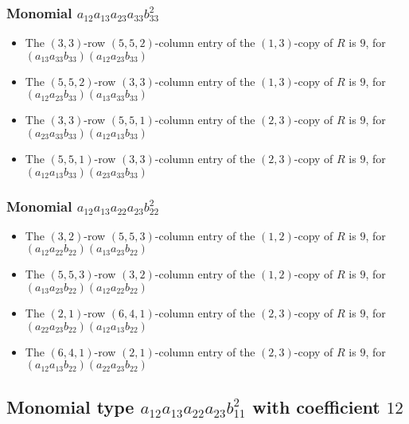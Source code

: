 \documentclass{article}
\begin{document}
\subsubsection{Monomial $ a_{12} a_{13} a_{23} a_{33} b_{33}^{2} $}

\begin{itemize}
\item The $(3, 3)$-row $(5, 5, 2)$-column entry of the $ \left(1, 3\right) $-copy of $R$ is $ 9 $, for $( a_{13} a_{33} b_{33} )( a_{12} a_{23} b_{33} )$ 
\item The $(5, 5, 2)$-row $(3, 3)$-column entry of the $ \left(1, 3\right) $-copy of $R$ is $ 9 $, for $( a_{12} a_{23} b_{33} )( a_{13} a_{33} b_{33} )$ 
\item The $(3, 3)$-row $(5, 5, 1)$-column entry of the $ \left(2, 3\right) $-copy of $R$ is $ 9 $, for $( a_{23} a_{33} b_{33} )( a_{12} a_{13} b_{33} )$ 
\item The $(5, 5, 1)$-row $(3, 3)$-column entry of the $ \left(2, 3\right) $-copy of $R$ is $ 9 $, for $( a_{12} a_{13} b_{33} )( a_{23} a_{33} b_{33} )$ 
\end{itemize}
\subsubsection{Monomial $ a_{12} a_{13} a_{22} a_{23} b_{22}^{2} $}

\begin{itemize}
\item The $(3, 2)$-row $(5, 5, 3)$-column entry of the $ \left(1, 2\right) $-copy of $R$ is $ 9 $, for $( a_{12} a_{22} b_{22} )( a_{13} a_{23} b_{22} )$ 
\item The $(5, 5, 3)$-row $(3, 2)$-column entry of the $ \left(1, 2\right) $-copy of $R$ is $ 9 $, for $( a_{13} a_{23} b_{22} )( a_{12} a_{22} b_{22} )$ 
\item The $(2, 1)$-row $(6, 4, 1)$-column entry of the $ \left(2, 3\right) $-copy of $R$ is $ 9 $, for $( a_{22} a_{23} b_{22} )( a_{12} a_{13} b_{22} )$ 
\item The $(6, 4, 1)$-row $(2, 1)$-column entry of the $ \left(2, 3\right) $-copy of $R$ is $ 9 $, for $( a_{12} a_{13} b_{22} )( a_{22} a_{23} b_{22} )$ 
\end{itemize}
\subsection{Monomial type $ a_{12} a_{13} a_{22} a_{23} b_{11}^{2} $ with coefficient $ 12 $}
\end{document}
